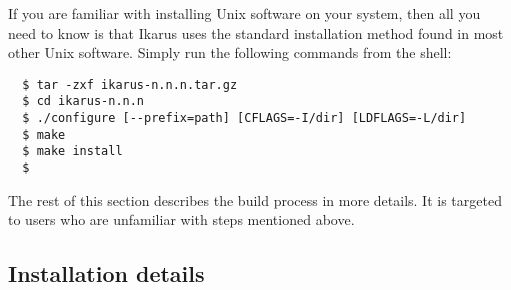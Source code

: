 \documentclass[onecolumn, 12pt, twoside, openright, dvipdfm]{book}
\begin{document}
If you are familiar with installing Unix software on your system,
then all you need to know is that Ikarus uses the standard
installation method found in most other Unix software.  Simply run
the following commands from the shell:
\begin{verbatim}
  $ tar -zxf ikarus-n.n.n.tar.gz
  $ cd ikarus-n.n.n
  $ ./configure [--prefix=path] [CFLAGS=-I/dir] [LDFLAGS=-L/dir]
  $ make
  $ make install
  $
\end{verbatim}

The rest of this section describes the build process in more
details.  It is targeted to users who are unfamiliar with steps
mentioned above.

\subsection{Installation details}
\end{document}
